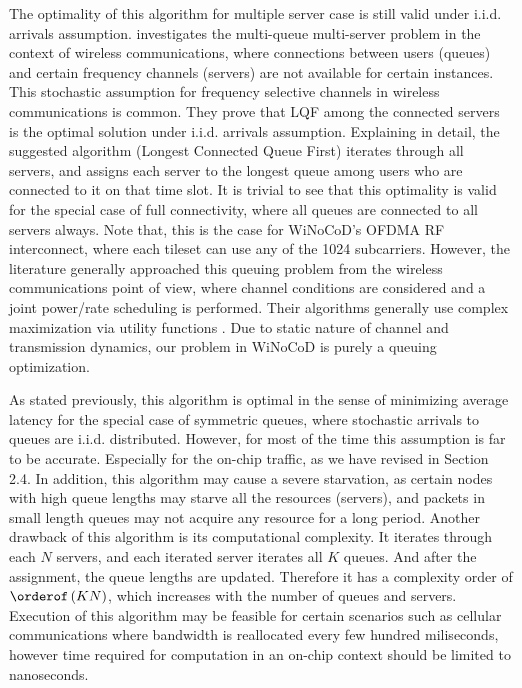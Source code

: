 The optimality of this algorithm for multiple server case is still valid under i.i.d. arrivals assumption. \cite{kittipiyakul2009delay} investigates the multi-queue multi-server problem in the context of wireless communications, where connections between users (queues) and certain frequency channels (servers) are not available for certain instances. This stochastic assumption for frequency selective channels in wireless communications is common. They prove that LQF among the connected servers is the optimal solution under i.i.d. arrivals assumption. Explaining in detail, the suggested algorithm (Longest Connected Queue First) iterates through all servers, and assigns each server to the longest queue among users who are connected to it on that time slot. It is trivial to see that this optimality is valid for the special case of full connectivity, where all queues are connected to all servers always. Note that, this is the case for WiNoCoD's OFDMA RF interconnect, where each tileset can use any of the 1024 subcarriers. However, the literature generally approached this queuing problem from the wireless communications point of view, where channel conditions are considered and a joint power/rate scheduling is performed. Their algorithms generally use complex maximization via utility functions \cite{li2010dynamic}\cite{eryilmaz2005fair}. Due to static nature of channel and transmission dynamics, our problem in WiNoCoD is purely a queuing optimization. 

As stated previously, this algorithm is optimal in the sense of minimizing average latency for the special case of symmetric queues, where stochastic arrivals to queues are i.i.d. distributed. However, for most of the time this assumption is far to be accurate. Especially for the on-chip traffic, as we have revised in Section 2.4. In addition, this algorithm may cause a severe starvation, as certain nodes with high queue lengths may starve all the resources (servers), and packets in small length queues may not acquire any resource for a long period. Another drawback of this algorithm is its computational complexity. It iterates through each $N$ servers, and each iterated server iterates all $K$ queues. And after the assignment, the queue lengths are updated. Therefore it has a complexity order of $\orderof\left( KN\right)$, which increases with the number of queues and servers. Execution of this algorithm may be feasible for certain scenarios such as cellular communications where bandwidth is reallocated every few hundred miliseconds, however time required for computation in an on-chip context should be limited to nanoseconds. 


